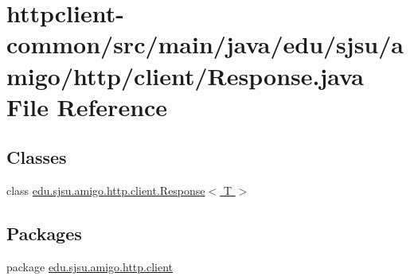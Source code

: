\hypertarget{httpclient-common_2src_2main_2java_2edu_2sjsu_2amigo_2http_2client_2_response_8java}{}\section{httpclient-\/common/src/main/java/edu/sjsu/amigo/http/client/\+Response.java File Reference}
\label{httpclient-common_2src_2main_2java_2edu_2sjsu_2amigo_2http_2client_2_response_8java}
\subsection*{Classes}
\begin{DoxyCompactItemize}
\item 
class \hyperlink{classedu_1_1sjsu_1_1amigo_1_1http_1_1client_1_1_response}{edu.\+sjsu.\+amigo.\+http.\+client.\+Response$<$ T $>$}
\end{DoxyCompactItemize}
\subsection*{Packages}
\begin{DoxyCompactItemize}
\item 
package \hyperlink{namespaceedu_1_1sjsu_1_1amigo_1_1http_1_1client}{edu.\+sjsu.\+amigo.\+http.\+client}
\end{DoxyCompactItemize}
